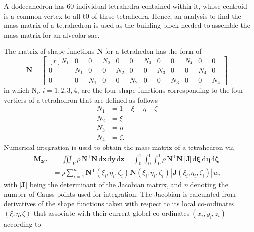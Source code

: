A dodecahedron has 60 individual tetrahedra contained within it, whose centroid is a common vertex to all 60 of these tetrahedra. Hence, an analysis to find the mass matrix of a tetrahedron is used as the building block needed to assemble the mass matrix for an alveolar sac.

The matrix of shape functions $\mathbf{N}$ for a tetrahedon has the form of
\begin{equation}
	\mathbf{N} =  
\begin{bmatrix*}[r]
	N_1 & 0 & 0 & N_2 & 0 & 0 & N_3 & 0 & 0 & N_4 & 0 & 0 \\
	0 & N_1 & 0 & 0 & N_2 & 0 & 0 & N_3 & 0 & 0 & N_4 & 0 \\
	0 & 0 & N_1 & 0 & 0 & N_2 & 0 & 0 & N_3 & 0 & 0 & N_4
\end{bmatrix*} 
	\label{shape3D}
\end{equation}
in which $\mathrm{N}_i$, $i = 1, 2, 3, 4$, are the four shape functions corresponding to the four vertices of a tetrahedron that are defined as follows
\begin{subequations}
\begin{align}
	N_1 & = 1 - \xi - \eta - \zeta \\
	N_2 & = \xi \\
	N_3 & = \eta \\
	N_4 & = \zeta .
\end{align}
\end{subequations}
Numerical integration is used to obtain the mass matrix of a tetrahedron via
\begin{equation}
    \begin{aligned}
    \mathbf{M}_{3C} & = \iiint_V \rho \, \mathbf{N}^{\mathsf{T}} \mathbf{N} \, \mathrm{d} \mathbf{x} \, \mathrm{d} \mathbf{y} \, \mathrm{d} \mathbf{z} = \int_0^1 \int_0^1 \int_0^1 \rho \, \mathbf{N}^{\mathsf{T}} \mathbf{N} \, | \mathbf{J} | \, \mathrm{d} \mathbf{\xi} \, \mathrm{d} \mathbf{\eta} \, \mathrm{d} \mathbf{\zeta} \\ & = \rho \sum_{i=1}^n \mathbf{N}^{\mathsf{T}} ( \xi_i , \eta_i , \zeta_i ) \, \mathbf{N} (\xi_i , \eta_i , \zeta_i ) \, |\mathbf{J} (\xi_i , \eta_i , \zeta_i )| \, w_i
    \end{aligned}
\end{equation}
with $|\mathbf{J}|$ being the determinant of the Jacobian matrix, and $n$ denoting the number of Gauss points used for integration.  The Jacobian is calculated from derivatives of the shape functions taken with respect to its local co-ordinates $(\xi, \eta, \zeta)$ that associate with their current global co-ordinates $(x_i, y_i, z_i)$ according to
